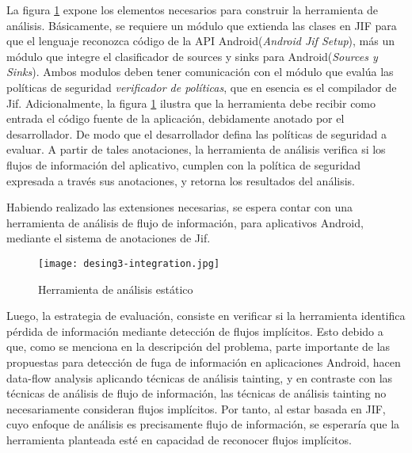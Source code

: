 La figura \ref{fig:desingInteger} expone los elementos necesarios para construir la
herramienta de análisis.
Básicamente, se requiere un módulo que extienda las clases en JIF para que el
lenguaje reconozca código de la API Android(\emph{Android Jif Setup}), más un
módulo que integre el clasificador de sources y sinks para Android(\emph{Sources
y Sinks}). 
Ambos modulos deben tener comunicación con el módulo que evalúa las
políticas de seguridad \emph{verificador de políticas}, que en esencia es el
compilador de Jif.\newline
Adicionalmente, la figura \ref{fig:desingInteger} ilustra que la herramienta
debe recibir como entrada el código fuente de la aplicación, debidamente
anotado por el desarrollador. De modo que el desarrollador defina las políticas
de seguridad a evaluar. A partir de tales anotaciones, la herramienta de
análisis verifica si los flujos de información del aplicativo, cumplen con la
política de seguridad expresada a través sus anotaciones, y retorna los
resultados del análisis.

Habiendo realizado las extensiones necesarias, se espera contar con una
herramienta de análisis de flujo de información, para aplicativos Android,
mediante el sistema de anotaciones de Jif.
\begin{figure}[t!]
	\begin{center}
	\texttt{[image: desing3-integration.jpg]} 
	\end{center}
	\caption{Herramienta de análisis estático  }
	\label{fig:desingInteger}
\end{figure}


Luego, la estrategia de evaluación, consiste en verificar si la herramienta
identifica pérdida de información mediante detección de flujos implícitos. Esto
debido a que, como se menciona en la descripción del problema, parte importante
de las propuestas para detección de fuga de información en aplicaciones Android,
hacen data-flow analysis aplicando técnicas de análisis tainting, y en contraste
con las técnicas de análisis de flujo de información, las técnicas de análisis
tainting no necesariamente consideran flujos implícitos. Por tanto, al estar
basada en JIF, cuyo enfoque de análisis es precisamente flujo de información, se
esperaría que la herramienta planteada esté en capacidad de reconocer flujos
implícitos.


